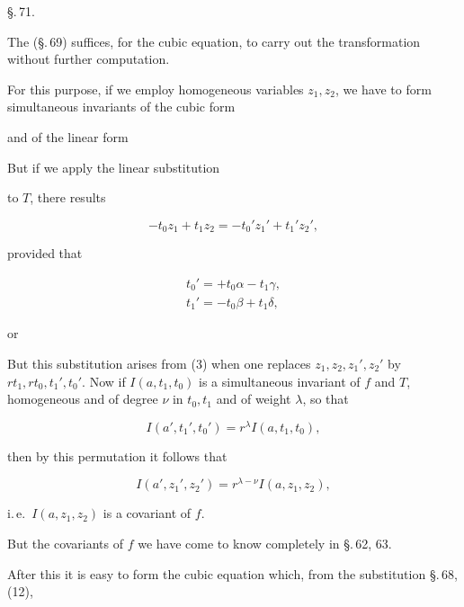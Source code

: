 
\begin{center}
\S.\,71.

\end{center}

The  (\S.\,69) suffices, for the cubic equation, to carry out the transformation without further computation.

For this purpose, if we employ homogeneous variables $z_1, z_2$, we have to form simultaneous invariants of the cubic form


and of the linear form


But if we apply the linear substitution


to $T$, there results

\[ -t_0z_1 + t_1z_2 = -t_0'z_1' + t_1'z_2', \]

provided that

\[ \begin{gathered} t_0' = +t_0\alpha - t_1\gamma, \\ t_1' = -t_0\beta + t_1\delta, \end{gathered} \]

or


But this substitution arises from (3) when one replaces $z_1, z_2, z_1', z_2'$ by $rt_1, rt_0, t_1', t_0'$. Now if $I(a,t_1,t_0)$ is a simultaneous invariant of $f$ and $T$, homogeneous and of degree $\nu$ in $t_0, t_1$ and of weight $\lambda$, so that

\[ I(a',t_1',t_0') = r^\lambda I(a,t_1,t_0), \]

then by this permutation it follows that

\[ I(a',z_1',z_2') = r^{\lambda-\nu}I(a,z_1,z_2), \]

i.\,e.\ $I(a,z_1,z_2)$ is a covariant of $f$.


But the covariants of $f$ we have come to know completely in \S.\,62, 63.

After this it is easy to form the cubic equation which, from the substitution \S.\,68, (12),
